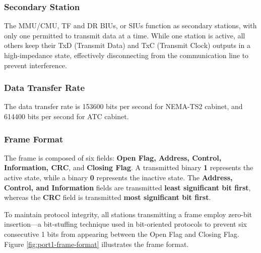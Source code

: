 \documentclass[]{article}
\begin{document}
\subsubsection {Secondary Station}
The MMU/CMU, TF and DR BIUs, or SIUs function as secondary stations, with only one permitted to transmit data at a time. While one station is active, all others keep their TxD (Transmit Data) and TxC (Transmit Clock) outputs in a high-impedance state, effectively disconnecting from the communication line to prevent interference.
 
\subsubsection {Data Transfer Rate}
 The data transfer rate is 153600 bits per second for NEMA-TS2 cabinet, and 614400 bits per second for ATC cabinet.
 
\subsubsection {Frame Format}
The frame is composed of six fields: \textbf{Open Flag, Address, Control, Information, CRC}, and \textbf{Closing Flag}. A transmitted binary \textbf{1} represents the active state, while a binary \textbf{0} represents the inactive state. The \textbf{Address, Control, and Information }fields are transmitted \textbf{least significant bit first}, whereas the \textbf{CRC} field is transmitted \textbf{most significant bit first}.  

To maintain protocol integrity, all stations transmitting a frame employ zero-bit insertion—a bit-stuffing technique used in bit-oriented protocols to prevent six consecutive 1 bits from appearing between the Open Flag and Closing Flag. Figure \ref{fig:port1-frame-format} illustrates the frame format.
\end{document}
